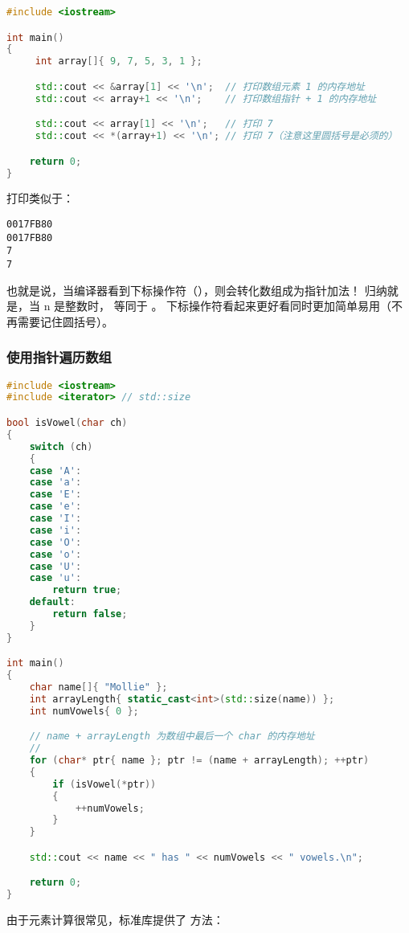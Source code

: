 \documentclass[../../LearnCpp.tex]{subfiles}
\begin{document}
\begin{lstlisting}[language=C++]
#include <iostream>

int main()
{
     int array[]{ 9, 7, 5, 3, 1 };

     std::cout << &array[1] << '\n';  // 打印数组元素 1 的内存地址
     std::cout << array+1 << '\n';    // 打印数组指针 + 1 的内存地址

     std::cout << array[1] << '\n';   // 打印 7
     std::cout << *(array+1) << '\n'; // 打印 7（注意这里圆括号是必须的）

    return 0;
}
\end{lstlisting}

打印类似于：

\begin{lstlisting}
0017FB80
0017FB80
7
7
\end{lstlisting}

也就是说，当编译器看到下标操作符（\acode{[]}），则会转化数组成为指针加法！
归纳就是，当 n 是整数时， 等同于 。
下标操作符看起来更好看同时更加简单易用（不再需要记住圆括号）。

\subsubsection*{使用指针遍历数组}

\begin{lstlisting}[language=C++]
#include <iostream>
#include <iterator> // std::size

bool isVowel(char ch)
{
    switch (ch)
    {
    case 'A':
    case 'a':
    case 'E':
    case 'e':
    case 'I':
    case 'i':
    case 'O':
    case 'o':
    case 'U':
    case 'u':
        return true;
    default:
        return false;
    }
}

int main()
{
    char name[]{ "Mollie" };
    int arrayLength{ static_cast<int>(std::size(name)) };
    int numVowels{ 0 };

    // name + arrayLength 为数组中最后一个 char 的内存地址
    //
    for (char* ptr{ name }; ptr != (name + arrayLength); ++ptr)
    {
        if (isVowel(*ptr))
        {
            ++numVowels;
        }
    }

    std::cout << name << " has " << numVowels << " vowels.\n";

    return 0;
}
\end{lstlisting}

由于元素计算很常见，标准库提供了  方法：
\end{document}
